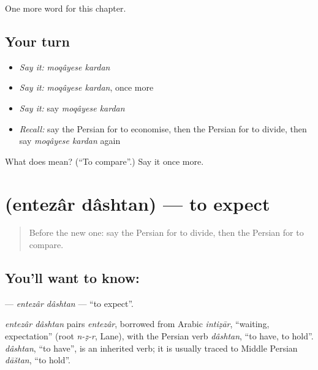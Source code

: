 \begin{grammarlens}[title={What you've built}]
One more word for this chapter.
\end{grammarlens}

\subsection*{Your turn}
\begin{itemize}
\raggedright
  \item \emph{Say it:} \emph{moqâyese kardan}
  \item \emph{Say it:} \emph{moqâyese kardan}, once more
  \item \emph{Say it:} say \emph{moqâyese kardan}
  \item \emph{Recall:} say the Persian for to economise, then the Persian for to divide, then say \emph{moqâyese kardan} again
\end{itemize}

\begin{tcolorbox}[breakable,colback=teal!4,colframe=teal!35!black,title={Before you move on}]
What does   mean? (\textquotedblleft{}To compare\textquotedblright{}.) Say it once more.
\end{tcolorbox}
\section[\texorpdfstring{\fa{انتظار} \fa{داشتن} (entezâr dâshtan)}{انتظار داشتن (entezâr dâshtan)}]{  (entezâr dâshtan) — to expect}

\label{lesson:FA-C149-entezar-dashtan}



\begin{quote}
Before the new one: say the Persian for to divide, then the Persian for to compare.
\end{quote}

\subsection*{You'll want to know:  }
\textbf{ } — \emph{entezâr dâshtan} — \textquotedblleft{}to expect\textquotedblright{}.

\begin{cousinweb}
\emph{entezâr dâshtan} pairs \emph{entezâr}, borrowed from Arabic \emph{intiẓār}, \textquotedblleft{}waiting, expectation\textquotedblright{} (root \emph{n-ẓ-r}, Lane), with the Persian verb \emph{dâshtan}, \textquotedblleft{}to have, to hold\textquotedblright{}. \emph{dâshtan}, \textquotedblleft{}to have\textquotedblright{}, is an inherited verb; it is usually traced to Middle Persian \emph{dāštan}, \textquotedblleft{}to hold\textquotedblright{}.
\end{cousinweb}

